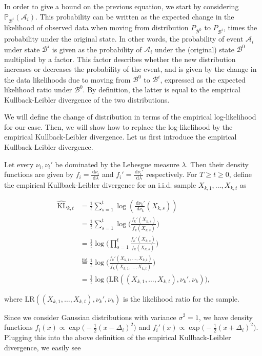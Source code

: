 \documentclass[11pt,]{article}
\newcommand{\KL}{\,\text{KL}}
\newcommand{\der}{\,\text{d}}
\begin{document}
In order to give a bound on the previous equation, we start by
considering \(\mathbb{P}_{\mathcal{B}^i}(\mathcal{A}_i)\). This
probability can be written as the expected change in the likelihood of
observed data when moving from distribution \(P_{\mathcal{B}^0}\) to
\(P_{\mathcal{B}^i}\), times the probability under the original state.
In other words, the probability of event \(\mathcal{A}_i\) under state
\(\mathcal{B}^i\) is given as the probability of \(\mathcal{A}_i\) under
the (original) state \(\mathcal{B}^0\) multiplied by a factor. This
factor describes whether the new distribution increases or decreases the
probability of the event, and is given by the change in the data
likelihoods due to moving from \(\mathcal{B}^0\) to \(\mathcal{B}^i\),
expressed as the expected likelihood ratio under \(\mathcal{B}^0\). By
definition, the latter is equal to the empirical Kullback-Leibler
divergence of the two distributions.

We will define the change of distribution in terms of the empirical
log-likelihood for our case. Then, we will show how to replace the
log-likelihood by the empirical Kullback-Leibler divergence. Let us
first introduce the empirical Kullback-Leibler divergence.

Let every \(\nu_i, \nu_i'\) be dominated by the Lebesgue measure
\(\lambda\). Then their density functions are given by
\(f_i = \frac{\der \nu_i}{\der \lambda}\) and
\(f_i' = \frac{\der \nu_i'}{\der \lambda}\) respectively. For
\(T \geq t \geq 0\), define the empirical Kullback-Leibler divergence
for an i.i.d. sample \(X_{k,1}, \dots,X_{k,t}\) as

\begin{align*}
\hat{\KL}_{k,t} & = \frac{1}{t} \sum_{s=1}^{t} \log(\frac{\der \nu_k'}{\der \nu_k}(X_{k,s})) \\
& = \frac{1}{t} \sum_{s=1}^{t} \log \big(\frac{f_k'(X_{k,s})}{f_k(X_{k,s})} \big) \\
& = \frac{1}{t} \log \big( \prod_{s=1}^{t} \frac{f_k'(X_{k,s})}{f_k(X_{k,s})} \big) \\
& \stackrel{\text{iid}}{=} \frac{1}{t} \log \big( \frac{f_k'(X_{k,1}, \dots,X_{k,t})}{f_k(X_{k,1}, \dots,X_{k,t})} \big) \\
& = \frac{1}{t} \log \big( \text{LR}((X_{k,1}, \dots,X_{k,t}), \nu_k', \nu_k) \big),
\end{align*}

where \(\text{LR}((X_{k,1}, \dots,X_{k,t}), \nu_k', \nu_k)\) is the
likelihood ratio for the sample.

Since we consider Gaussian distributions with variance \(\sigma^2 = 1\),
we have density functions
\(f_i(x) \propto \exp \big(-\frac{1}{2} (x-\Delta_i)^2\big)\) and
\(f_i'(x) \propto \exp \big(-\frac{1}{2} (x+\Delta_i)^2\big)\). Plugging
this into the above definition of the empirical Kullback-Leibler
divergence, we easily see
\end{document}
